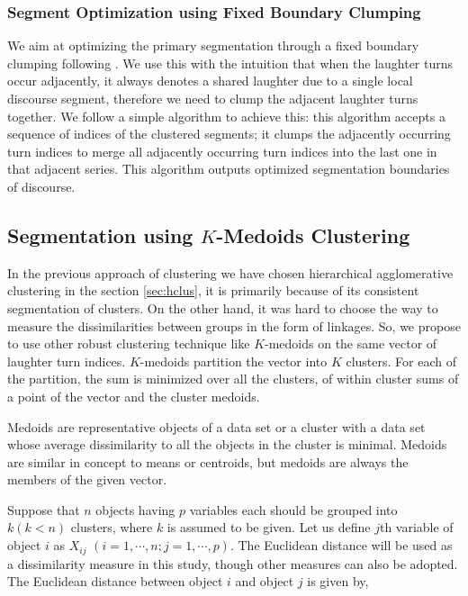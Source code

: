 \documentclass{article}
\begin{document}
\subsubsection{Segment Optimization using Fixed Boundary Clumping}\label{sec:opthclus}
We aim at optimizing the primary segmentation through a fixed boundary clumping following \cite{niekrasz-10}. We use this with the intuition that when the laughter turns occur adjacently, it always denotes a shared laughter due to a single local discourse segment, therefore we need to clump the adjacent laughter turns together. We follow a simple algorithm to achieve this:
%
this algorithm accepts a sequence of indices of the clustered segments; it clumps the adjacently occurring turn indices to merge all adjacently occurring turn indices into the last one in that adjacent series. %
This algorithm outputs optimized segmentation boundaries of discourse. %


\subsection{Segmentation using $K$-Medoids Clustering}\label{sec:kmclus}
In the previous approach of clustering we have chosen hierarchical agglomerative clustering in the section \ref{sec:hclus}, it is primarily because of its consistent segmentation of clusters. On the other hand, it was hard to choose the way to measure the dissimilarities between groups in the form of linkages. So, we propose to use other robust clustering technique like $K$-medoids on the same vector of laughter turn indices. $K$-medoids partition the vector into $K$ clusters. For each of the partition, the sum is minimized over all the clusters, of within cluster sums of a point of the vector and the cluster medoids. 

Medoids are representative objects of a data set or a cluster with a data set whose average dissimilarity to all the objects in the cluster is minimal. Medoids are similar in concept to means or centroids, but medoids are always the members of the given vector.  

Suppose that $n$ objects having $p$ variables each should be grouped into $k (k < n)$ clusters, where $k$ is assumed to be given. Let us define $j$th variable of object $i$ as $X_{ij}$ $(i = 1,\cdots,n; j = 1,\cdots,p)$. The Euclidean distance will be used as a dissimilarity measure in this study, though other measures can also be adopted. The Euclidean distance between object $i$ and object $j$ is given by, 
\end{document}
